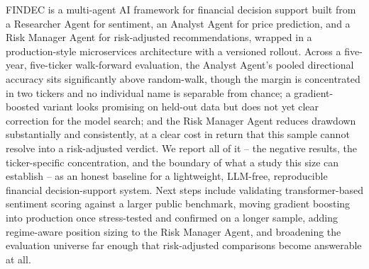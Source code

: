 \documentclass[conference]{IEEEtran}
\begin{document}
FINDEC is a multi-agent AI framework for financial decision support built from a Researcher Agent for sentiment, an Analyst Agent for price prediction, and a Risk Manager Agent for risk-adjusted recommendations, wrapped in a production-style microservices architecture with a versioned rollout. Across a five-year, five-ticker walk-forward evaluation, the Analyst Agent's pooled directional accuracy sits significantly above random-walk, though the margin is concentrated in two tickers and no individual name is separable from chance; a gradient-boosted variant looks promising on held-out data but does not yet clear correction for the model search; and the Risk Manager Agent reduces drawdown substantially and consistently, at a clear cost in return that this sample cannot resolve into a risk-adjusted verdict. We report all of it -- the negative results, the ticker-specific concentration, and the boundary of what a study this size can establish -- as an honest baseline for a lightweight, LLM-free, reproducible financial decision-support system. Next steps include validating transformer-based sentiment scoring against a larger public benchmark, moving gradient boosting into production once stress-tested and confirmed on a longer sample, adding regime-aware position sizing to the Risk Manager Agent, and broadening the evaluation universe far enough that risk-adjusted comparisons become answerable at all.



\end{document}
